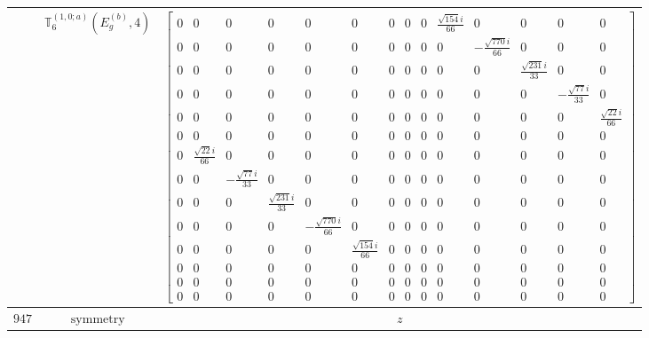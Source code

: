 \documentclass[fleqn,8pt,landscape]{jsarticle}
\begin{document}
\begin{longtable}{ccc}
$  $ & $ \mathbb{T}_{6}^{(1,0;a)}(E_{g}^{(b)},4) $ & $ \begin{bmatrix} 0 & 0 & 0 & 0 & 0 & 0 & 0 & 0 & 0 & \frac{\sqrt{154} i}{66} & 0 & 0 & 0 & 0 \\ 0 & 0 & 0 & 0 & 0 & 0 & 0 & 0 & 0 & 0 & - \frac{\sqrt{770} i}{66} & 0 & 0 & 0 \\ 0 & 0 & 0 & 0 & 0 & 0 & 0 & 0 & 0 & 0 & 0 & \frac{\sqrt{231} i}{33} & 0 & 0 \\ 0 & 0 & 0 & 0 & 0 & 0 & 0 & 0 & 0 & 0 & 0 & 0 & - \frac{\sqrt{77} i}{33} & 0 \\ 0 & 0 & 0 & 0 & 0 & 0 & 0 & 0 & 0 & 0 & 0 & 0 & 0 & \frac{\sqrt{22} i}{66} \\ 0 & 0 & 0 & 0 & 0 & 0 & 0 & 0 & 0 & 0 & 0 & 0 & 0 & 0 \\ 0 & \frac{\sqrt{22} i}{66} & 0 & 0 & 0 & 0 & 0 & 0 & 0 & 0 & 0 & 0 & 0 & 0 \\ 0 & 0 & - \frac{\sqrt{77} i}{33} & 0 & 0 & 0 & 0 & 0 & 0 & 0 & 0 & 0 & 0 & 0 \\ 0 & 0 & 0 & \frac{\sqrt{231} i}{33} & 0 & 0 & 0 & 0 & 0 & 0 & 0 & 0 & 0 & 0 \\ 0 & 0 & 0 & 0 & - \frac{\sqrt{770} i}{66} & 0 & 0 & 0 & 0 & 0 & 0 & 0 & 0 & 0 \\ 0 & 0 & 0 & 0 & 0 & \frac{\sqrt{154} i}{66} & 0 & 0 & 0 & 0 & 0 & 0 & 0 & 0 \\ 0 & 0 & 0 & 0 & 0 & 0 & 0 & 0 & 0 & 0 & 0 & 0 & 0 & 0 \\ 0 & 0 & 0 & 0 & 0 & 0 & 0 & 0 & 0 & 0 & 0 & 0 & 0 & 0 \\ 0 & 0 & 0 & 0 & 0 & 0 & 0 & 0 & 0 & 0 & 0 & 0 & 0 & 0 \end{bmatrix} $ \\ \hline
$ 947 $ & $ \text{symmetry} $ & $ z $ \\

\end{longtable}
\end{document}
